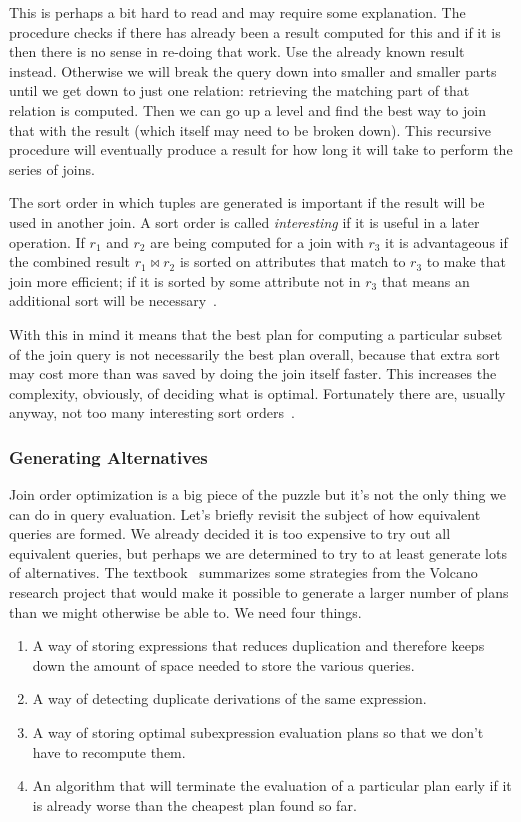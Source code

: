 \documentclass[a4paper]{report}
\begin{document}
This is perhaps a bit hard to read and may require some explanation. The procedure checks if there has already been a result computed for this and if it is then there is no sense in re-doing that work. Use the already known result instead. Otherwise we will break the query down into smaller and smaller parts until we get down to just one relation: retrieving the matching part of that relation is computed. Then we can go up a level and find the best way to join that with the result (which itself may need to be broken down). This recursive procedure will eventually produce a result for how long it will take to perform the series of joins.

The sort order in which tuples are generated is important if the result will be used in another join. A sort order is called \textit{interesting} if it is useful in a later operation. If $r_{1}$ and $r_{2}$ are being computed for a join with $r_{3}$ it is advantageous if the combined result $r_{1} \bowtie r_{2}$ is sorted on attributes that match to $r_{3}$ to make that join more efficient; if it is sorted by some attribute not in $r_{3}$ that means an additional sort will be necessary~\cite{dsc}.

With this in mind it means that the best plan for computing a particular subset of the join query is not necessarily the best plan overall, because that extra sort may cost more than was saved by doing the join itself faster. This increases the complexity, obviously, of deciding what is optimal. Fortunately there are, usually anyway, not too many interesting sort orders~\cite{dsc}. 

\subsubsection*{Generating Alternatives}

Join order optimization is a big piece of the puzzle but it's not the only thing we can do in query evaluation. Let's briefly revisit the subject of how equivalent queries are formed. We already decided it is too expensive to try out all equivalent queries, but perhaps we are determined to try to at least generate lots of alternatives. The textbook~\cite{dsc} summarizes some strategies from the Volcano research project that would make it possible to generate a larger number of plans than we might otherwise be able to. We need four things.

\begin{enumerate}
	\item A way of storing expressions that reduces duplication and therefore keeps down the amount of space needed to store the various queries.
	\item A way of detecting duplicate derivations of the same expression.
	\item A way of storing optimal subexpression evaluation plans so that we don't have to recompute them.
	\item An algorithm that will terminate the evaluation of a particular plan early if it is already worse than the cheapest plan found so far.
\end{enumerate}
\end{document}
